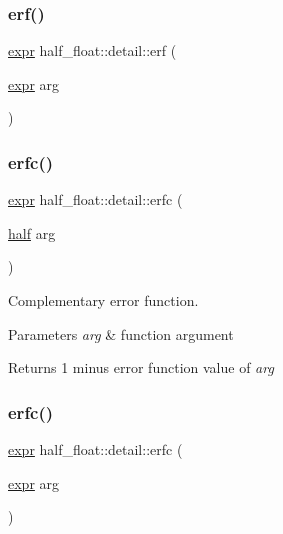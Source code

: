\subsubsection{\texorpdfstring{erf()}{erf()}\hspace{0.1cm}{\footnotesize\ttfamily [2/2]}}
{\footnotesize\ttfamily \hyperlink{structhalf__float_1_1detail_1_1expr}{expr} half\+\_\+float\+::detail\+::erf (\begin{DoxyParamCaption}\item[{\hyperlink{structhalf__float_1_1detail_1_1expr}{expr}}]{arg }\end{DoxyParamCaption})\hspace{0.3cm}{\ttfamily [inline]}}

\mbox{\label{namespacehalf__float_1_1detail_ae03035153282371dbc8691ebadcc4fb0}} 
\subsubsection{\texorpdfstring{erfc()}{erfc()}\hspace{0.1cm}{\footnotesize\ttfamily [1/2]}}
{\footnotesize\ttfamily \hyperlink{structhalf__float_1_1detail_1_1expr}{expr} half\+\_\+float\+::detail\+::erfc (\begin{DoxyParamCaption}\item[{\hyperlink{classhalf__float_1_1half}{half}}]{arg }\end{DoxyParamCaption})\hspace{0.3cm}{\ttfamily [inline]}}

Complementary error function. 
\begin{DoxyParams}{Parameters}
{\em arg} & function argument \\
\hline
\end{DoxyParams}
\begin{DoxyReturn}{Returns}
1 minus error function value of {\itshape arg} 
\end{DoxyReturn}
\mbox{\label{namespacehalf__float_1_1detail_a987a584f9cd8b5e84339c8f4cefca641}} 
\subsubsection{\texorpdfstring{erfc()}{erfc()}\hspace{0.1cm}{\footnotesize\ttfamily [2/2]}}
{\footnotesize\ttfamily \hyperlink{structhalf__float_1_1detail_1_1expr}{expr} half\+\_\+float\+::detail\+::erfc (\begin{DoxyParamCaption}\item[{\hyperlink{structhalf__float_1_1detail_1_1expr}{expr}}]{arg }\end{DoxyParamCaption})\hspace{0.3cm}{\ttfamily [inline]}}

